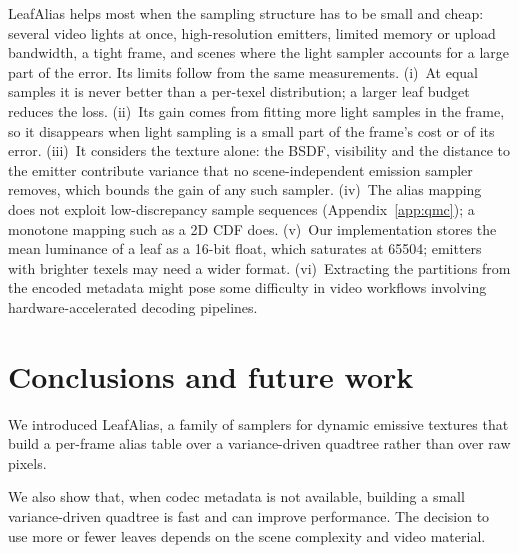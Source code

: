 \documentclass[acmtog,review]{acmart}
\begin{document}
\newbegin
LeafAlias helps most when the sampling structure has to be small and cheap: several video lights at once, high-resolution emitters, limited memory or upload bandwidth, a tight frame, and scenes where the light sampler accounts for a large part of the error. Its limits follow from the same measurements. (i)~At equal samples it is never better than a per-texel distribution; a larger leaf budget reduces the loss. (ii)~Its gain comes from fitting more light samples in the frame, so it disappears when light sampling is a small part of the frame's cost or of its error. (iii)~It considers the texture alone: the BSDF, visibility and the distance to the emitter contribute variance that no scene-independent emission sampler removes, which bounds the gain of any such sampler. (iv)~The alias mapping does not exploit low-discrepancy sample sequences (Appendix~\ref{app:qmc}); a monotone mapping such as a 2D CDF does. (v)~Our implementation stores the mean luminance of a leaf as a 16-bit float, which saturates at 65504; emitters with brighter texels may need a wider format. (vi)~Extracting the partitions from the encoded metadata might pose some difficulty in video workflows involving hardware-accelerated decoding pipelines.
\newend

\section{Conclusions and future work} \label{sec:conclusions}

We introduced LeafAlias, a family of samplers for dynamic emissive textures that build a per-frame alias table over a variance-driven quadtree rather than over raw pixels. 

 We also show that, when codec metadata is not available, building a small variance-driven quadtree is fast and can improve performance. The decision to use more or fewer leaves depends on the scene complexity and video material.
\end{document}
